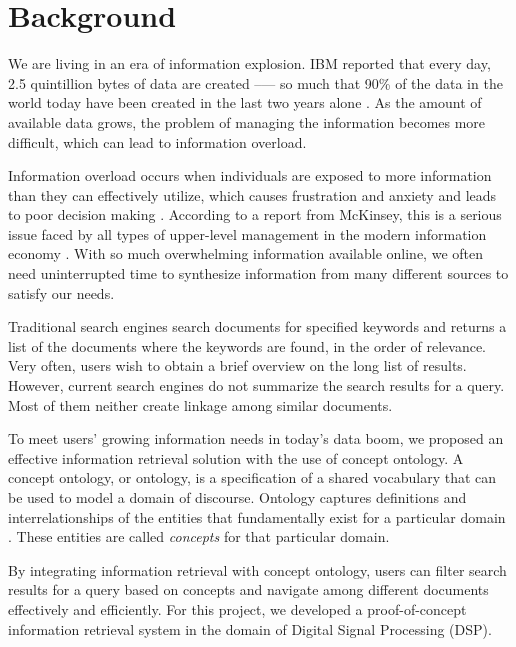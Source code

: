 \section{Background}
We are living in an era of information explosion. IBM reported that every day, 2.5 quintillion bytes of data are created --— so much that 90\% of the data in the world today have been created in the last two years alone \cite{IBMBigData}. As the amount of available data grows, the problem of managing the information becomes more difficult, which can lead to information overload.

Information overload occurs when individuals are exposed to more information than they can effectively utilize, which causes frustration and anxiety and leads to poor decision making \cite{Shenk1997}. According to a report from McKinsey, this is a serious issue faced by all types of upper-level management in the modern information economy \cite{Dean2011}. With so much overwhelming information available online, we often need uninterrupted time to synthesize information from many different sources to satisfy our needs.

Traditional search engines search documents for specified keywords and returns a list of the documents where the keywords are found, in the order of relevance. Very often, users wish to obtain a brief overview on the long list of results. However, current search engines do not summarize the search results for a query. Most of them neither create linkage among similar documents.

To meet users' growing information needs in today's data boom, we proposed an effective information retrieval solution with the use of concept ontology. A concept ontology, or ontology, is a specification of a shared vocabulary that can be used to model a domain of discourse. Ontology captures definitions and interrelationships of the entities that fundamentally exist for a particular domain \cite{Kapoor2010}. These entities are called \textit{concepts} for that particular domain.

By integrating information retrieval with concept ontology, users can filter search results for a query based on concepts and navigate among different documents effectively and efficiently. For this project, we developed a proof-of-concept information retrieval system in the domain of Digital Signal Processing (DSP).